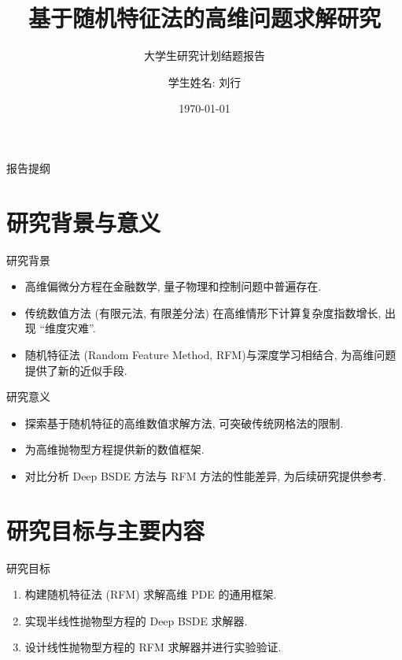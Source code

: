 \documentclass[aspectratio=169,10pt]{beamer}
\title{基于随机特征法的高维问题求解研究}
\subtitle{大学生研究计划结题报告}
\author{学生姓名: 刘行}
\institute{中国科学技术大学大学\quad 少年班学院}
\date{\today}
\begin{document}
    \begin{frame}
        \titlepage
    \end{frame}

    \begin{frame}{报告提纲}
        \tableofcontents
    \end{frame}

    \section{研究背景与意义}
    \begin{frame}{研究背景}
        \begin{itemize}
            \item 高维偏微分方程在金融数学, 量子物理和控制问题中普遍存在.
            \item 传统数值方法 (有限元法, 有限差分法) 在高维情形下计算复杂度指数增长, 出现 ``维度灾难''.
            \item 随机特征法 (Random Feature Method, RFM)与深度学习相结合, 为高维问题提供了新的近似手段.
        \end{itemize}
    \end{frame}

    \begin{frame}{研究意义}
        \begin{itemize}
            \item 探索基于随机特征的高维数值求解方法, 可突破传统网格法的限制.
            \item 为高维抛物型方程提供新的数值框架.
            \item 对比分析 Deep BSDE 方法与 RFM 方法的性能差异, 为后续研究提供参考.
        \end{itemize}
    \end{frame}

    \section{研究目标与主要内容}
    \begin{frame}{研究目标}
        \begin{enumerate}
            \item 构建随机特征法 (RFM) 求解高维 PDE 的通用框架.
            \item 实现半线性抛物型方程的 Deep BSDE 求解器.
            \item 设计线性抛物型方程的 RFM 求解器并进行实验验证.
        \end{enumerate}
    \end{frame}
\end{document}
